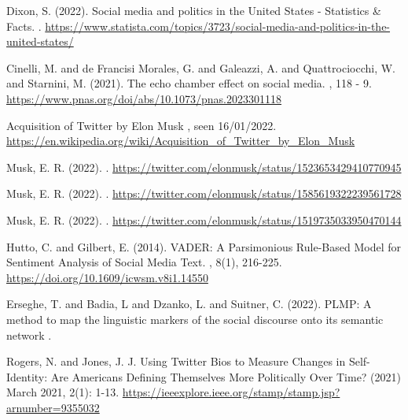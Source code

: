 \documentclass[twoside,twocolumn]{article}
\begin{document}
	
	\begin{thebibliography}{99}
		
		Dixon, S. (2022).
		\newblock Social media and politics in the United States - Statistics \& Facts.
		.
		\newblock \url{https://www.statista.com/topics/3723/social-media-and-politics-in-the-united-states/}
		
		Cinelli, M. and de Francisi Morales, G. and Galeazzi, A. and Quattrociocchi, W. and Starnini, M. (2021).
		\newblock The echo chamber effect on social media.
		, 118 - 9.
		\newblock \url{https://www.pnas.org/doi/abs/10.1073/pnas.2023301118}
		
		\newblock Acquisition of Twitter by Elon Musk
		, seen 16/01/2022.
		\newblock \url{https://en.wikipedia.org/wiki/Acquisition_of_Twitter_by_Elon_Musk}
		
		Musk, E. R. (2022).
		.
		\newblock \url{https://twitter.com/elonmusk/status/1523653429410770945}
		
		Musk, E. R. (2022).
		.
		\newblock \url{https://twitter.com/elonmusk/status/1585619322239561728}
		
		Musk, E. R. (2022).
		.
		\newblock \url{https://twitter.com/elonmusk/status/1519735033950470144}
		
		Hutto, C. and Gilbert, E. (2014).
		\newblock VADER: A Parsimonious Rule-Based Model for Sentiment Analysis of Social Media Text.
		, 8(1), 216-225.
		\newblock \url{https://doi.org/10.1609/icwsm.v8i1.14550}
		
		Erseghe, T. and Badia, L and Dzanko, L. and Suitner, C. (2022).
		\newblock PLMP: A method to map the linguistic markers of the social discourse onto its semantic network
		.
		
		Rogers, N. and Jones, J. J.
		\newblock Using Twitter Bios to Measure Changes in Self-Identity: Are Americans Defining Themselves More Politically Over Time? (2021)
		 March 2021, 2(1): 1-13.
		\newblock \url{https://ieeexplore.ieee.org/stamp/stamp.jsp?arnumber=9355032}
		
		
	\end{thebibliography}
	
	
\end{document}
